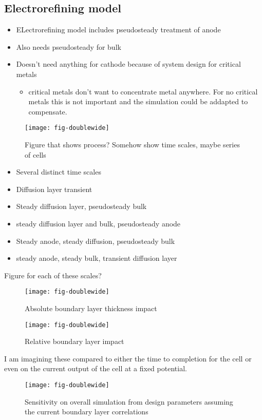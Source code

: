\documentclass[journal=mamobx]{achemso}
\begin{document}
\subsection{Electrorefining model}
\begin{itemize}
  \item ELectrorefining model includes pseudosteady treatment of anode
  \item Also needs pseudosteady for bulk
  \item Doesn't need anything for cathode because of system design for critical metals
  \begin{itemize}
    \item critical metals don't want to concentrate metal anywhere. For no critical metals this is not important and the simulation could be addapted to compensate.
  \end{itemize}
\end{itemize}
\begin{figure*}[htbp!]
  \texttt{[image: fig-doublewide]}
  \caption{Figure that shows process? Somehow show time scales, maybe series of cells}
  \label{fig-doublewide}
\end{figure*}
\begin{itemize}
  \item Several distinct time scales
  \item Diffusion layer transient
  \item Steady diffusion layer, pseudosteady bulk
  \item steady diffusion layer and bulk, pseudosteady anode
  \item Steady anode, steady diffusion, pseudosteady bulk
  \item steady anode, steady bulk, transient diffusion layer
\end{itemize}
Figure for each of these scales?

\begin{figure*}[htbp!]
  \texttt{[image: fig-doublewide]}
  \caption{Absolute boundary layer thickness impact}
  \label{fig-doublewide}
\end{figure*}
\begin{figure*}[htbp!]
  \texttt{[image: fig-doublewide]}
  \caption{Relative boundary layer impact}
  \label{fig-doublewide}
\end{figure*}
I am imagining these compared to either the time to completion for the cell or even on the current output of the cell at a fixed potential.
\begin{figure*}[htbp!]
  \texttt{[image: fig-doublewide]}
  \caption{Sensitivity on overall simulation from design parameters assuming the current boundary layer correlations}
  \label{fig-doublewide}
\end{figure*}
\end{document}
